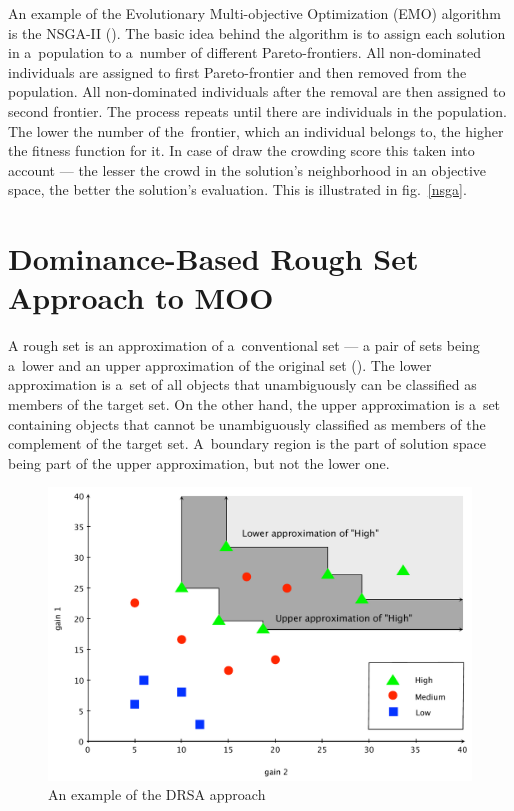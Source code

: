 An example of the Evolutionary Multi-objective Optimization (EMO) algorithm is
the NSGA-II (\cite{Deb00}). The basic idea behind the algorithm is to assign
each solution in a~population to a~number of different Pareto-frontiers. All
non-dominated individuals are assigned to first Pareto-frontier and then
removed from the population. All non-dominated individuals after the removal
are then assigned to second frontier. The process repeats until there are
individuals in the population. The lower the number of the~frontier, which an
individual belongs to, the higher the fitness function for it. In case of draw
the crowding score this taken into account --- the lesser the crowd in the
solution's neighborhood in an objective space, the better the solution's
evaluation. This is illustrated in fig.~\ref{nsga}.


\section{Dominance-Based Rough Set Approach to MOO}
\label{sec_drsa_in_moo}

A rough set is an approximation of a~conventional set --- a pair of sets being
a~lower and an upper approximation of the original set (\cite{Paw82}). The
lower approximation is a~set of all objects that unambiguously can be
classified as members of the target set. On the other hand, the upper
approximation is a~set containing objects that cannot be unambiguously
classified as members of the complement of the target set.  A~boundary region
is the part of solution space being part of the upper approximation, but not
the lower one.

\begin{figure}
  \centering \includegraphics[scale=0.5]{img/drsa}
  \caption{An example of the DRSA approach}
  \label{drsa}
\end{figure}

